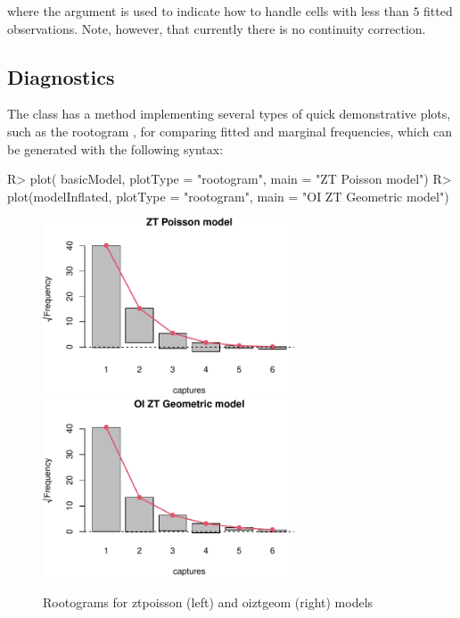 \documentclass[nojss]{jss}
\newcommand{\1}{\mathcal{I}} \newcommand{\bZero}{\boldsymbol{0}}
\begin{document}
where the  argument is used to indicate how to handle cells
with less than \(5\) fitted observations. Note, however, that currently
there is no continuity correction.

\subsection{Diagnostics}\label{diagnostics}

The  class has a  method
implementing several types of quick demonstrative plots, such as the
rootogram \citep[cf.][]{rootogram}, for comparing fitted and marginal
frequencies, which can be generated with the following syntax:

\begin{CodeChunk}
\begin{CodeInput}
R> plot(   basicModel, plotType = "rootogram", main = "ZT Poisson model")
R> plot(modelInflated, plotType = "rootogram", main = "OI ZT Geometric model")
\end{CodeInput}
\begin{figure}[ht]

{\centering \includegraphics[width=7.5cm]{singleRcapture_files/figure-latex/rootogram-1} \includegraphics[width=7.5cm]{singleRcapture_files/figure-latex/rootogram-2}

}

\caption[Rootograms for ztpoisson (left) and oiztgeom (right) models]{Rootograms for ztpoisson (left) and oiztgeom (right) models}\label{fig:rootogram}
\end{figure}
\end{CodeChunk}
\end{document}
